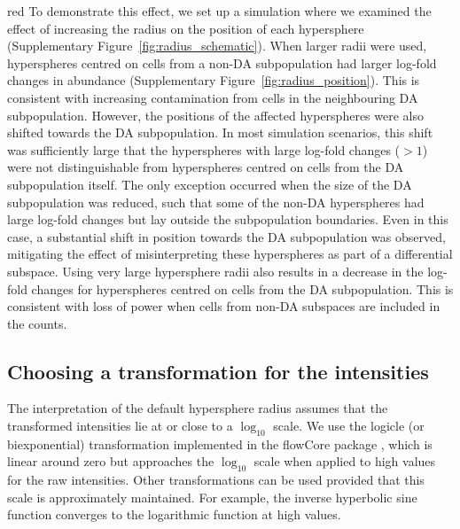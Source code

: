 \documentclass{article}
\begin{document}
\begin{color}{red}
To demonstrate this effect, we set up a simulation where we examined the effect of increasing the radius on the position of each hypersphere (Supplementary Figure~\ref{fig:radius_schematic}).
When larger radii were used, hyperspheres centred on cells from a non-DA subpopulation had larger log-fold changes in abundance (Supplementary Figure~\ref{fig:radius_position}).
This is consistent with increasing contamination from cells in the neighbouring DA subpopulation.
However, the positions of the affected hyperspheres were also shifted towards the DA subpopulation.
In most simulation scenarios, this shift was sufficiently large that the hyperspheres with large log-fold changes ($>1$) were not distinguishable from hyperspheres centred on cells from the DA subpopulation itself.
The only exception occurred when the size of the DA subpopulation was reduced, such that some of the non-DA hyperspheres had large log-fold changes but lay outside the subpopulation boundaries.
Even in this case, a substantial shift in position towards the DA subpopulation was observed, mitigating the effect of misinterpreting these hyperspheres as part of a differential subspace.
Using very large hypersphere radii also results in a decrease in the log-fold changes for hyperspheres centred on cells from the DA subpopulation.
This is consistent with loss of power when cells from non-DA subspaces are included in the counts.

\subsection{Choosing a transformation for the intensities}
The interpretation of the default hypersphere radius assumes that the transformed intensities lie at or close to a $\log_{10}$ scale.
We use the logicle (or biexponential) transformation \cite{parks2006new} implemented in the flowCore package \cite{hahne2009flowcore}, which is linear around zero but approaches the $\log_{10}$ scale when applied to high values for the raw intensities.
Other transformations can be used provided that this scale is approximately maintained.
For example, the inverse hyperbolic sine function converges to the logarithmic function at high values.


\end{color}
\end{document}
